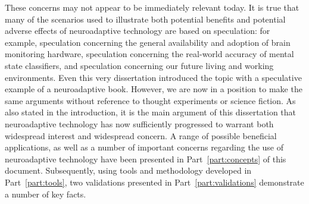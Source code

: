 These concerns may not appear to be immediately relevant today. It is true that many of the scenarios used to illustrate both potential benefits and potential adverse effects of neuroadaptive technology are based on speculation: for example, speculation concerning the general availability and adoption of brain monitoring hardware, speculation concerning the real-world accuracy of mental state classifiers, and speculation concerning our future living and working environments. Even this very dissertation introduced the topic with a speculative example of a neuroadaptive book. However, we are now in a position to make the same arguments without reference to thought experiments or science fiction. As also stated in the introduction, it is the main argument of this dissertation that neuroadaptive technology has now sufficiently progressed to warrant both widespread interest and widespread concern. A range of possible beneficial applications, as well as a number of important concerns regarding the use of neuroadaptive technology have been presented in Part~\ref{part:concepts} of this document. Subsequently, using tools and methodology developed in Part~\ref{part:tools}, two validations presented in Part~\ref{part:validations} demonstrate a number of key facts.

